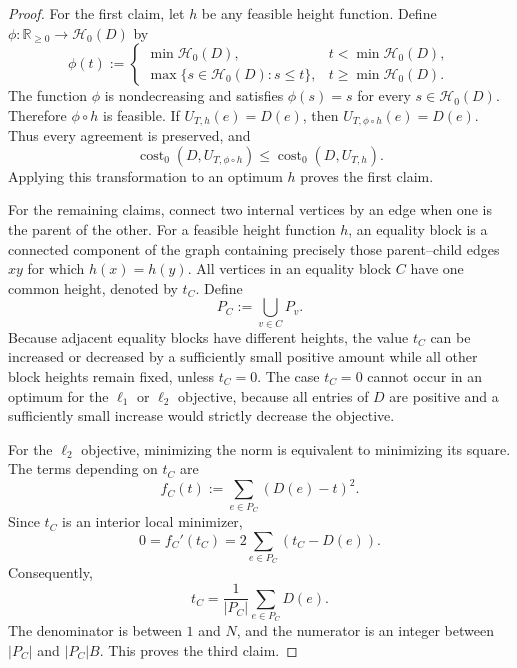 \documentclass[11pt]{article}
\theoremstyle{definition}
\newcommand{\R}{\mathbb{R}}
\newcommand{\cH}{\mathcal{H}}
\newcommand{\cost}{\operatorname{cost}}
\begin{document}
\begin{proof}
For the first claim, let \(h\) be any feasible height function.  Define
\(\phi:\R_{\ge0}\to\cH_0(D)\) by
\[
 \phi(t):=
 \begin{cases}
  \min\cH_0(D),&t<\min\cH_0(D),\\
  \max\{s\in\cH_0(D):s\le t\},&t\ge\min\cH_0(D).
 \end{cases}
\]
The function \(\phi\) is nondecreasing and satisfies \(\phi(s)=s\) for every
\(s\in\cH_0(D)\).  Therefore \(\phi\circ h\) is feasible.  If
\(U_{T,h}(e)=D(e)\), then
\(U_{T,\phi\circ h}(e)=D(e)\).  Thus every agreement is preserved, and
\[
 \cost_0(D,U_{T,\phi\circ h})
 \le \cost_0(D,U_{T,h}).
\]
Applying this transformation to an optimum \(h\) proves the first claim.

For the remaining claims, connect two internal vertices by an edge when one
is the parent of the other.  For a feasible height function \(h\), an equality
block is a connected component of the graph containing precisely those
parent--child edges \(xy\) for which \(h(x)=h(y)\).  All vertices in an
equality block \(C\) have one common height, denoted by \(t_C\).  Define
\[
 P_C:=\bigcup_{v\in C}P_v.
\]
Because adjacent equality blocks have different heights, the value \(t_C\)
can be increased or decreased by a sufficiently small positive amount while
all other block heights remain fixed, unless \(t_C=0\).  The case \(t_C=0\)
cannot occur in an optimum for the \(\ell_1\) or \(\ell_2\) objective, because
all entries of \(D\) are positive and a sufficiently small increase would
strictly decrease the objective.

For the \(\ell_2\) objective, minimizing the norm is equivalent to minimizing
its square.  The terms depending on \(t_C\) are
\[
 f_C(t):=\sum_{e\in P_C}(D(e)-t)^2.
\]
Since \(t_C\) is an interior local minimizer,
\[
 0=f_C'(t_C)=2\sum_{e\in P_C}(t_C-D(e)).
\]
Consequently,
\[
 t_C=\frac{1}{|P_C|}\sum_{e\in P_C}D(e).
\]
The denominator is between \(1\) and \(N\), and the numerator is an integer
between \(|P_C|\) and \(|P_C|B\).  This proves the third claim.


\end{proof}
\end{document}
